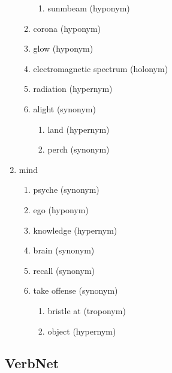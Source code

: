 \documentclass[11pt,a4paper,twocolumn]{article}
\begin{document}
\begin{enumerate}
\begin{enumerate}
\begin{enumerate}
							\item sunmbeam (hyponym)
								
						\end{enumerate}											
					\item corona (hyponym)
					
					\item glow (hyponym)
					
					\item electromagnetic spectrum (holonym)
					
					\item radiation (hypernym)
					
					\item alight (synonym)
						\begin{enumerate}
							\item land (hypernym)
							
							\item perch (synonym)
						\end{enumerate}					
					
				\end{enumerate}
			
			\item mind			
				\begin{enumerate}
					\item psyche (synonym)
					
					\item ego (hyponym)
					
					\item knowledge (hypernym)
					
					\item brain (synonym)
					
					\item recall (synonym)
					
					\item take offense (synonym)
						\begin{enumerate}
							\item bristle at (troponym)
							
							\item object (hypernym)
						\end{enumerate}
				\end{enumerate}						
			
		\end{enumerate}
	\subsection{VerbNet}
	
\end{document}
